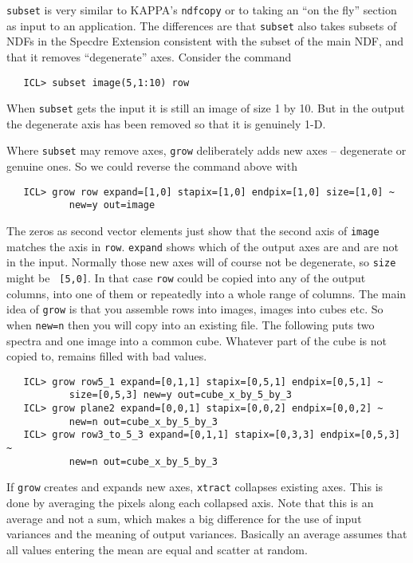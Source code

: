 {\tt subset} is very similar to KAPPA's {\tt ndfcopy} or to taking an
``on the fly'' section as input to an application.  The differences are
that {\tt subset} also takes subsets of NDFs in the Specdre
Extension consistent with the subset of the main NDF,
and that it removes ``degenerate'' axes.  Consider the command

\begin{verbatim}
   ICL> subset image(5,1:10) row
\end{verbatim}

When {\tt subset} gets the input it is still an image of size 1 by
10.  But in the output the degenerate axis has been removed so that it
is genuinely 1-D.

Where {\tt subset} may remove axes, {\tt grow} deliberately adds new
axes -- degenerate or genuine ones.  So we could reverse the command
above with

\begin{verbatim}
   ICL> grow row expand=[1,0] stapix=[1,0] endpix=[1,0] size=[1,0] ~
           new=y out=image
\end{verbatim}

The zeros as second vector elements just show that the second axis of
{\tt image} matches the axis in {\tt row}.  {\tt expand} shows which
of the output axes are and are not in the input.  Normally those new
axes will of course not be degenerate, so {\tt size} might be {\tt
[5,0]}.  In that case {\tt row} could be copied into any of the
output columns, into one of them or repeatedly into a whole range of
columns.  The main idea of {\tt grow} is that you assemble rows into
images, images into cubes etc.  So when {\tt new=n} then you will
copy into an existing file.  The following puts two spectra and one
image into a common cube.  Whatever part of the cube is not copied to,
remains filled with bad values.

\begin{verbatim}
   ICL> grow row5_1 expand=[0,1,1] stapix=[0,5,1] endpix=[0,5,1] ~
           size=[0,5,3] new=y out=cube_x_by_5_by_3
   ICL> grow plane2 expand=[0,0,1] stapix=[0,0,2] endpix=[0,0,2] ~
           new=n out=cube_x_by_5_by_3
   ICL> grow row3_to_5_3 expand=[0,1,1] stapix=[0,3,3] endpix=[0,5,3] ~
           new=n out=cube_x_by_5_by_3
\end{verbatim}


If {\tt grow} creates and expands new axes, {\tt xtract} collapses
existing axes.  This is done by averaging the pixels along each
collapsed axis.  Note that this is an average and not a sum, which
makes a big difference for the use of input variances and the meaning
of output variances.  Basically an average assumes that all values
entering the mean are equal and scatter at random.

